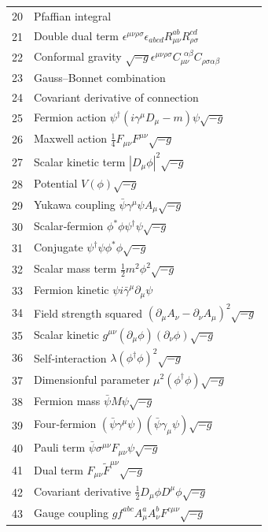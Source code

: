 \documentclass[12pt,a4paper]{article}
\begin{document}
\begin{longtable}{r l}
		20 & Pfaffian integral \\
		21 & Double dual term \(\epsilon^{\mu\nu\rho\sigma}\epsilon_{abcd}R_{\mu\nu}^{ab}R_{\rho\sigma}^{cd}\) \\
		22 & Conformal gravity \(\sqrt{-g}\epsilon^{\mu\nu\rho\sigma}C_{\mu\nu}^{\ \ \alpha\beta}C_{\rho\sigma\alpha\beta}\) \\
		23 & Gauss–Bonnet combination \\
		24 & Covariant derivative of connection \\
		25 & Fermion action \(\psi^\dagger(i\gamma^\mu D_\mu - m)\psi\sqrt{-g}\) \\
		26 & Maxwell action \(\frac{1}{4}F_{\mu\nu}F^{\mu\nu}\sqrt{-g}\) \\
		27 & Scalar kinetic term \(|D_\mu\phi|^2\sqrt{-g}\) \\
		28 & Potential \(V(\phi)\sqrt{-g}\) \\
		29 & Yukawa coupling \(\bar{\psi}\gamma^\mu\psi A_\mu\sqrt{-g}\) \\
		30 & Scalar‑fermion \(\phi^*\phi\psi^\dagger\psi\sqrt{-g}\) \\
		31 & Conjugate \(\psi^\dagger\psi\phi^*\phi\sqrt{-g}\) \\
		32 & Scalar mass term \(\frac{1}{2}m^2\phi^2\sqrt{-g}\) \\
		33 & Fermion kinetic \(\psi i\bar{\gamma}^\mu\partial_\mu\psi\) \\
		34 & Field strength squared \((\partial_\mu A_\nu - \partial_\nu A_\mu)^2\sqrt{-g}\) \\
		35 & Scalar kinetic \(g^{\mu\nu}(\partial_\mu\phi)(\partial_\nu\phi)\sqrt{-g}\) \\
		36 & Self‑interaction \(\lambda(\phi^\dagger\phi)^2\sqrt{-g}\) \\
		37 & Dimensionful parameter \(\mu^2(\phi^\dagger\phi)\sqrt{-g}\) \\
		38 & Fermion mass \(\bar{\psi}M\psi\sqrt{-g}\) \\
		39 & Four‑fermion \((\bar{\psi}\gamma^\mu\psi)(\bar{\psi}\gamma_\mu\psi)\sqrt{-g}\) \\
		40 & Pauli term \(\bar{\psi}\sigma^{\mu\nu}F_{\mu\nu}\psi\sqrt{-g}\) \\
		41 & Dual term \(F_{\mu\nu}\tilde{F}^{\mu\nu}\sqrt{-g}\) \\
		42 & Covariant derivative \(\frac{1}{2}D_\mu\phi D^\mu\phi\sqrt{-g}\) \\
		43 & Gauge coupling \(g f^{abc}A^a_\mu A^b_\nu F^{c\mu\nu}\sqrt{-g}\) \\

\end{longtable}
\end{document}
